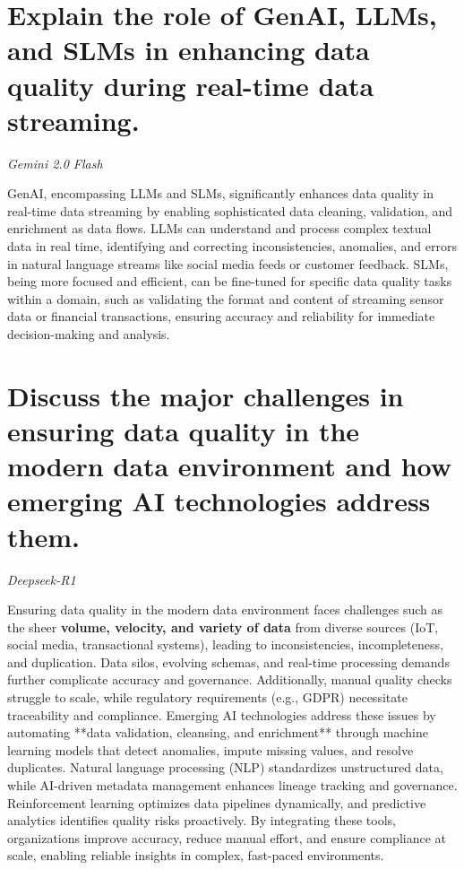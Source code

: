 \section{Explain the role of GenAI, LLMs, and SLMs in enhancing data quality 
during real-time data streaming.}

\textit{Gemini 2.0 Flash}

GenAI, encompassing LLMs and SLMs, significantly enhances data quality in real-time data streaming by enabling sophisticated data cleaning, validation, and enrichment as data flows. LLMs can understand and process complex textual data in real time, identifying and correcting inconsistencies, anomalies, and errors in natural language streams like social media feeds or customer feedback. SLMs, being more focused and efficient, can be fine-tuned for specific data quality tasks within a domain, such as validating the format and content of streaming sensor data or financial transactions, ensuring accuracy and reliability for immediate decision-making and analysis.

\section{Discuss the major challenges in ensuring data quality in the modern data 
environment and how emerging AI technologies address them.}

\textit{Deepseek-R1}

Ensuring data quality in the modern data environment faces challenges such as the sheer \textbf{volume, velocity, and variety of data} from diverse sources (IoT, social media, transactional systems), leading to inconsistencies, incompleteness, and duplication. Data silos, evolving schemas, and real-time processing demands further complicate accuracy and governance. Additionally, manual quality checks struggle to scale, while regulatory requirements (e.g., GDPR) necessitate traceability and compliance. Emerging AI technologies address these issues by automating **data validation, cleansing, and enrichment** through machine learning models that detect anomalies, impute missing values, and resolve duplicates. Natural language processing (NLP) standardizes unstructured data, while AI-driven metadata management enhances lineage tracking and governance. Reinforcement learning optimizes data pipelines dynamically, and predictive analytics identifies quality risks proactively. By integrating these tools, organizations improve accuracy, reduce manual effort, and ensure compliance at scale, enabling reliable insights in complex, fast-paced environments.


